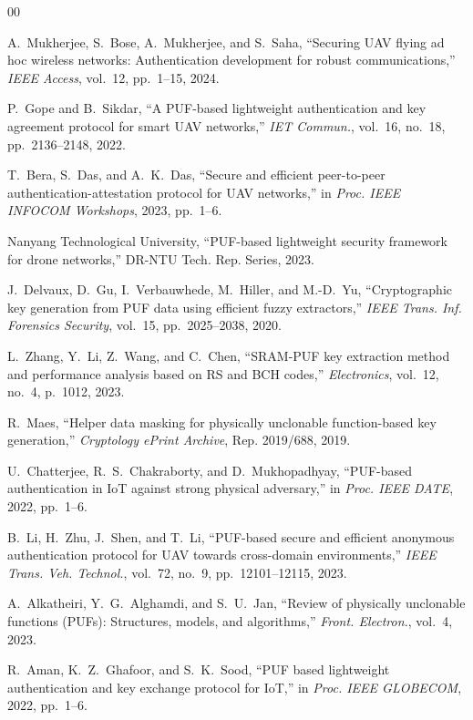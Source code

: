 \documentclass[journal]{IEEEtran}
\begin{document}
\begin{thebibliography}{00}

A.~Mukherjee, S.~Bose, A.~Mukherjee, and S.~Saha, ``Securing UAV flying ad hoc wireless networks: Authentication development for robust communications,'' \emph{IEEE Access}, vol.~12, pp.~1--15, 2024.

P.~Gope and B.~Sikdar, ``A PUF-based lightweight authentication and key agreement protocol for smart UAV networks,'' \emph{IET Commun.}, vol.~16, no.~18, pp.~2136--2148, 2022.

T.~Bera, S.~Das, and A.~K.~Das, ``Secure and efficient peer-to-peer authentication-attestation protocol for UAV networks,'' in \emph{Proc. IEEE INFOCOM Workshops}, 2023, pp.~1--6.

Nanyang Technological University, ``PUF-based lightweight security framework for drone networks,'' DR-NTU Tech. Rep. Series, 2023.

J.~Delvaux, D.~Gu, I.~Verbauwhede, M.~Hiller, and M.-D.~Yu, ``Cryptographic key generation from PUF data using efficient fuzzy extractors,'' \emph{IEEE Trans. Inf. Forensics Security}, vol.~15, pp.~2025--2038, 2020.

L.~Zhang, Y.~Li, Z.~Wang, and C.~Chen, ``SRAM-PUF key extraction method and performance analysis based on RS and BCH codes,'' \emph{Electronics}, vol.~12, no.~4, p.~1012, 2023.

R.~Maes, ``Helper data masking for physically unclonable function-based key generation,'' \emph{Cryptology ePrint Archive}, Rep. 2019/688, 2019.

U.~Chatterjee, R.~S.~Chakraborty, and D.~Mukhopadhyay, ``PUF-based authentication in IoT against strong physical adversary,'' in \emph{Proc. IEEE DATE}, 2022, pp.~1--6.

B.~Li, H.~Zhu, J.~Shen, and T.~Li, ``PUF-based secure and efficient anonymous authentication protocol for UAV towards cross-domain environments,'' \emph{IEEE Trans. Veh. Technol.}, vol.~72, no.~9, pp.~12101--12115, 2023.

A.~Alkatheiri, Y.~G.~Alghamdi, and S.~U.~Jan, ``Review of physically unclonable functions (PUFs): Structures, models, and algorithms,'' \emph{Front. Electron.}, vol.~4, 2023.

R.~Aman, K.~Z.~Ghafoor, and S.~K.~Sood, ``PUF based lightweight authentication and key exchange protocol for IoT,'' in \emph{Proc. IEEE GLOBECOM}, 2022, pp.~1--6.


\end{thebibliography}
\end{document}
